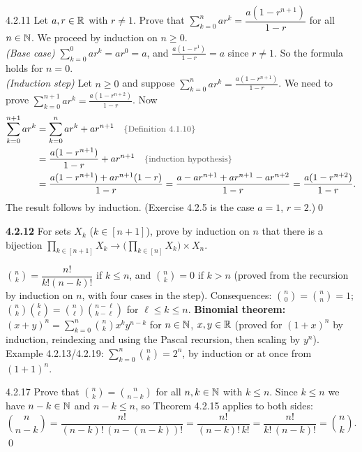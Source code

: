 \begin{bookex}[essential]{4.2.11}
Let $a,r\in\mathbb{R}$ with $r\ne1$. Prove that $\sum_{k=0}^nar^k=\dfrac{a(1-r^{n+1})}{1-r}$ for all $n\in\mathbb{N}$.
\solution
We proceed by induction on $n\ge0$.\\
\emph{(Base case)} $\sum_{k=0}^0ar^k=ar^0=a$, and $\frac{a(1-r^1)}{1-r}=a$ since $r\ne1$. So the formula holds for $n=0$.\\
\emph{(Induction step)} Let $n\ge0$ and suppose $\sum_{k=0}^nar^k=\frac{a(1-r^{n+1})}{1-r}$. We need to prove $\sum_{k=0}^{n+1}ar^k=\frac{a(1-r^{n+2})}{1-r}$. Now
\begin{align*}
\sum_{k=0}^{n+1}ar^k&=\sum_{k=0}^nar^k+ar^{n+1}\reason{Definition 4.1.10}\\
&=\frac{a(1-r^{n+1})}{1-r}+ar^{n+1}\reason{induction hypothesis}\\
&=\frac{a(1-r^{n+1})+ar^{n+1}(1-r)}{1-r}=\frac{a-ar^{n+1}+ar^{n+1}-ar^{n+2}}{1-r}=\frac{a(1-r^{n+2})}{1-r}.
\end{align*} The result follows by induction. (Exercise 4.2.5 is the case $a=1$, $r=2$.)\qed
\end{bookex}

\begin{trybox}[{4.2.12 \fO}]
\textbf{4.2.12} For sets $X_k$ ($k\in[n+1]$), prove by induction on $n$ that there is a bijection $\prod_{k\in[n+1]}X_k\to\big(\prod_{k\in[n]}X_k\big)\times X_n$. 
\end{trybox}

\begin{result}
$\binom nk=\dfrac{n!}{k!(n-k)!}$ if $k\le n$, and $\binom nk=0$ if $k>n$ (proved from the recursion by induction on $n$, with four cases in the step). Consequences: $\binom n0=\binom nn=1$; $\binom nk\binom k\ell=\binom n\ell\binom{n-\ell}{k-\ell}$ for $\ell\le k\le n$. \textbf{Binomial theorem:} $(x+y)^n=\sum_{k=0}^n\binom nkx^ky^{n-k}$ for $n\in\mathbb{N}$, $x,y\in\mathbb{R}$ (proved for $(1+x)^n$ by induction, reindexing and using the Pascal recursion, then scaling by $y^n$). Example 4.2.13/4.2.19: $\sum_{k=0}^n\binom nk=2^n$, by induction or at once from $(1+1)^n$.
\end{result}

\begin{bookex}[recommended]{4.2.17}
Prove that $\binom nk=\binom n{n-k}$ for all $n,k\in\mathbb{N}$ with $k\le n$.
\solution
Since $k\le n$ we have $n-k\in\mathbb{N}$ and $n-k\le n$, so Theorem 4.2.15 applies to both sides:
\[
\binom n{n-k}=\frac{n!}{(n-k)!\,(n-(n-k))!}=\frac{n!}{(n-k)!\,k!}=\frac{n!}{k!\,(n-k)!}=\binom nk .
\]\qed
\end{bookex}

